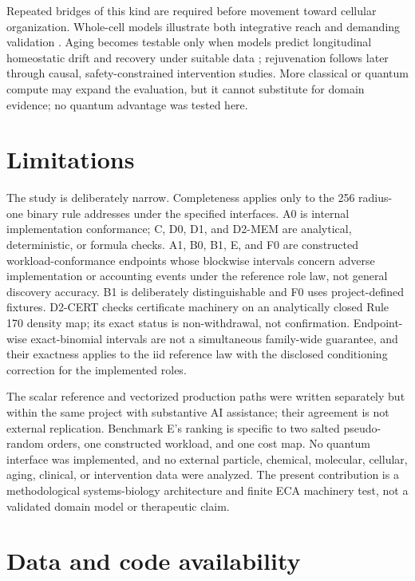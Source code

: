 \documentclass[10pt]{article}
\theoremstyle{definition}
\begin{document}
Repeated bridges of this kind are required before movement toward cellular organization.
Whole-cell models illustrate both integrative reach and demanding validation
\citep{karr2012,thornburg2022,thornburg2026,thornburg2026correction}. Aging becomes testable only
when models predict longitudinal homeostatic drift and recovery under suitable data
\citep{lopezotin2013,lopezotin2023}; rejuvenation follows later through causal,
safety-constrained intervention studies. More classical or quantum compute may expand the
evaluation, but it cannot substitute for domain evidence; no quantum advantage was tested here.

\enlargethispage{2\baselineskip}
\section{Limitations}

The study is deliberately narrow. Completeness applies only to the 256 radius-one binary rule
addresses under the specified interfaces. A0 is internal implementation conformance; C, D0, D1,
and D2-MEM are analytical, deterministic, or formula checks. A1, B0, B1, E, and F0 are constructed
workload-conformance endpoints whose blockwise intervals concern adverse implementation or
accounting events under the reference role law, not general discovery accuracy. B1 is deliberately
distinguishable and F0 uses project-defined fixtures. D2-CERT checks certificate machinery on an
analytically closed Rule 170 density map; its exact status is non-withdrawal, not confirmation.
Endpoint-wise exact-binomial intervals are not a simultaneous family-wide guarantee, and their
exactness applies to the iid reference law with the disclosed conditioning correction for the
implemented roles.

The scalar reference and vectorized production paths were written separately but within the same
project with substantive AI assistance; their agreement is not external replication. Benchmark E's ranking is
specific to two salted pseudo-random orders, one constructed workload, and one cost map. No quantum
interface was implemented, and no external particle, chemical, molecular,
cellular, aging, clinical, or intervention data were analyzed. The present contribution is a
methodological systems-biology architecture and finite ECA machinery test, not a validated domain
model or therapeutic claim.

\section{Data and code availability}
\end{document}
